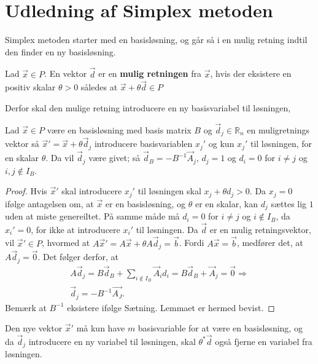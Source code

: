 \section{Udledning af Simplex metoden}
Simplex metoden starter med en basisløsning, og går så i en mulig retning indtil den finder en ny basisløsning.

\begin{defn}
Lad $\vec{x} \in P$. En vektor $\vec{d}$ er en \textbf{mulig retningen} fra $\vec{x}$, hvis der eksistere en positiv skalar $\theta > 0$ således at $\vec{x}+\theta\vec{d} \in P$ 
\end{defn}

Derfor skal den mulige retning introducere en ny basisvariabel til løsningen,

\begin{lma}
Lad $\vec{x} \in P$ være en basisløsning med basis matrix $B$ og $\vec{d}_j  \in \mathds{R}_n$ en muligretnings vektor så $\vec{x}' = \vec{x}+ \theta\vec{d}_j$ introducere basisvariablen $x_j'$ og kun $x_j'$ til løsningen, for en skalar $\theta$.
Da vil $\vec{d}_j$ være givet; så $\vec{d}_B = -B^{-1}\vec{A}_j$, $d_j = 1$ og $d_i = 0$ for $i \neq j$ og $ i,j \notin I_B$.
\label{lma:retningsvektor}
\end{lma}

\begin{proof}
Hvis $\vec{x}'$ skal introducere $x_j'$ til løsningen skal $x_j + \theta d_j > 0$. 
Da $x_j = 0$ ifølge antagelsen om, at $\vec{x}$ er en basisløsning, og $\theta$ er en skalar, kan $d_j$ sættes lig $1$ uden at miste genereiltet. 
På samme måde må $d_i = 0$ for $i \neq j$ og $i \notin I_B$, da $x_i' = 0$, for ikke at introducere $x_i'$ til løsningen.
Da $\vec{d}$ er en mulig retningsvektor, vil $\vec{x}' \in P$, hvormed at $A\vec{x}' = A\vec{x}+ \theta A\vec{d}_j = \vec{b}$. 
Fordi $A\vec{x} = \vec{b}$, medfører det, at $A\vec{d}_j = \vec{0}$.
Det følger derfor, at
\begin{align*}
A\vec{d}_j = B \vec{d}_B + \sum_{i \notin I_B} \vec{A}_id_i = B\vec{d}_B + \vec{A}_j = \vec{0} \Rightarrow
\\ \vec{d}_j = -B^{-1}\vec{A_J}.
\end{align*}
Bemærk at $B^{-1}$ eksistere ifølge Sætning. 
Lemmaet er hermed bevist.
\end{proof}

Den nye vektor $\vec{x}'$ må kun have $m$ basisvariable for at være en basisløsning, og da $\vec{d}_j$ introducere en ny variabel til løsningen, skal $\theta^*\vec{d}$ også fjerne en variabel fra  løsningen.


